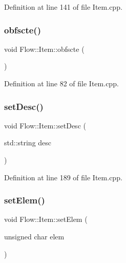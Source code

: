 Definition at line 141 of file Item.\+cpp.

\hypertarget{class_flow_1_1_item_a47c4c34cc77d924cb788b6e1e3e3cf06}{}\label{class_flow_1_1_item_a47c4c34cc77d924cb788b6e1e3e3cf06} 
\subsubsection{\texorpdfstring{obfscte()}{obfscte()}}
{\footnotesize\ttfamily void Flow\+::\+Item\+::obfscte (\begin{DoxyParamCaption}{ }\end{DoxyParamCaption})}



Definition at line 82 of file Item.\+cpp.

\hypertarget{class_flow_1_1_item_a049ca0cdfdb8492cf8221e75fc6137cc}{}\label{class_flow_1_1_item_a049ca0cdfdb8492cf8221e75fc6137cc} 
\subsubsection{\texorpdfstring{set\+Desc()}{setDesc()}}
{\footnotesize\ttfamily void Flow\+::\+Item\+::set\+Desc (\begin{DoxyParamCaption}\item[{std\+::string}]{desc }\end{DoxyParamCaption})}



Definition at line 189 of file Item.\+cpp.

\hypertarget{class_flow_1_1_item_adc5e15019d0859bf9844c26f5ef7505b}{}\label{class_flow_1_1_item_adc5e15019d0859bf9844c26f5ef7505b} 
\subsubsection{\texorpdfstring{set\+Elem()}{setElem()}}
{\footnotesize\ttfamily void Flow\+::\+Item\+::set\+Elem (\begin{DoxyParamCaption}\item[{unsigned char}]{elem }\end{DoxyParamCaption})}



